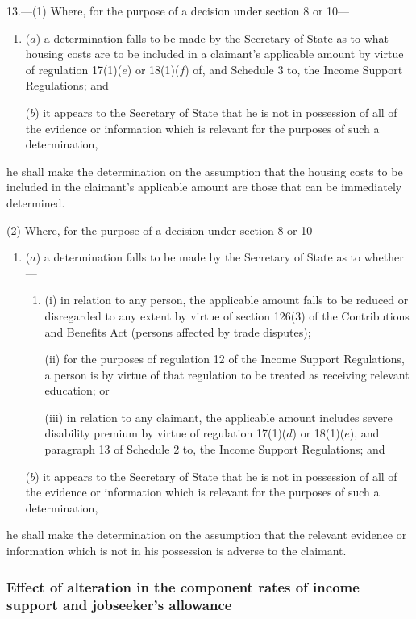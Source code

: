 \documentclass[12pt,a4paper]{article}
\begin{document}
13.—(1) Where, for the purpose of a decision under section 8 or 10—
\begin{enumerate}\item[]
($a$) a determination falls to be made by the Secretary of State as to what housing costs are to be included in a claimant’s applicable amount by virtue of regulation 17(1)($e$) or 18(1)($f$) of, and Schedule 3 to, the Income Support Regulations; and

($b$) it appears to the Secretary of State that he is not in possession of all of the evidence or information which is relevant for the purposes of such a determination,
\end{enumerate}
he shall make the determination on the assumption that the housing costs to be included in the claimant’s applicable amount are those that can be immediately determined.

(2) Where, for the purpose of a decision under section 8 or 10—
\begin{enumerate}\item[]
($a$) a determination falls to be made by the Secretary of State as to whether—
\begin{enumerate}\item[]
(i) in relation to any person, the applicable amount falls to be reduced or disregarded to any extent by virtue of section 126(3) of the Contributions and Benefits Act (persons affected by trade disputes);

(ii) for the purposes of regulation 12 of the Income Support Regulations, a person is by virtue of that regulation to be treated as receiving relevant education; or

(iii) in relation to any claimant, the applicable amount includes severe disability premium by virtue of regulation 17(1)($d$) or 18(1)($e$), and paragraph 13 of Schedule 2 to, the Income Support Regulations; and
\end{enumerate}

($b$) it appears to the Secretary of State that he is not in possession of all of the evidence or information which is relevant for the purposes of such a determination,
\end{enumerate}
he shall make the determination on the assumption that the relevant evidence or information which is not in his possession is adverse to the claimant.

\subsubsection[14. Effect of alteration in the component rates of income support and jobseeker’s allowance]{Effect of alteration in the component rates of income support and jobseeker’s allowance}
\end{document}

